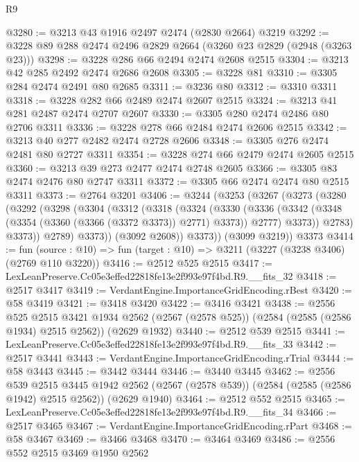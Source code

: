 \begin{lexlean}{R9}
\begin{coremodule}
@3280 := @3213 @43 @1916 @2497 @2474 (@2830 @2664) @3219
@3292 := @3228 @89 @288 @2474 @2496 @2829 @2664 (@3260 @23 @2829 (@2948 (@3263 @23)))
@3298 := @3228 @286 @66 @2494 @2474 @2608 @2515
@3304 := @3213 @42 @285 @2492 @2474 @2686 @2608
@3305 := @3228 @81
@3310 := @3305 @284 @2474 @2491 @80 @2685
@3311 := @3236 @80
@3312 := @3310 @3311
@3318 := @3228 @282 @66 @2489 @2474 @2607 @2515
@3324 := @3213 @41 @281 @2487 @2474 @2707 @2607
@3330 := @3305 @280 @2474 @2486 @80 @2706 @3311
@3336 := @3228 @278 @66 @2484 @2474 @2606 @2515
@3342 := @3213 @40 @277 @2482 @2474 @2728 @2606
@3348 := @3305 @276 @2474 @2481 @80 @2727 @3311
@3354 := @3228 @274 @66 @2479 @2474 @2605 @2515
@3360 := @3213 @39 @273 @2477 @2474 @2748 @2605
@3366 := @3305 @83 @2474 @2476 @80 @2747 @3311
@3372 := @3305 @66 @2474 @2474 @80 @2515 @3311
@3373 := @2764 @3201
@3406 := @3244
    (@3253
      (@3267
        (@3273
          (@3280
            (@3292
              (@3298
                (@3304
                  (@3312
                    (@3318
                      (@3324
                        (@3330
                          (@3336
                            (@3342 (@3348 (@3354 (@3360 (@3366 (@3372 @3373)) @2771) @3373)) @2777)
                            @3373))
                        @2783)
                      @3373))
                  @2789)
                @3373))
            (@3092 @2608))
          @3373))
      (@3099 @3219))
    @3373
@3414 := fun (source : @10) => fun (target : @10) => @3211 (@3227 (@3238 @3406) (@2769 @110 @3220))
@3416 := @2512 @525 @2515
@3417 := LexLeanPreserve.Cc05e3effed22818fe13e2f993e97f4bd.R9.__fits_32
@3418 := @2517 @3417
@3419 := VerdantEngine.ImportanceGridEncoding.rBest
@3420 := @58 @3419
@3421 := @3418 @3420
@3422 := @3416 @3421
@3438 := @2556
    @525
    @2515
    @3421
    @1934
    @2562
    (@2567 (@2578 @525))
    (@2584 (@2585 (@2586 @1934) @2515 @2562))
    (@2629 @1932)
@3440 := @2512 @539 @2515
@3441 := LexLeanPreserve.Cc05e3effed22818fe13e2f993e97f4bd.R9.__fits_33
@3442 := @2517 @3441
@3443 := VerdantEngine.ImportanceGridEncoding.rTrial
@3444 := @58 @3443
@3445 := @3442 @3444
@3446 := @3440 @3445
@3462 := @2556
    @539
    @2515
    @3445
    @1942
    @2562
    (@2567 (@2578 @539))
    (@2584 (@2585 (@2586 @1942) @2515 @2562))
    (@2629 @1940)
@3464 := @2512 @552 @2515
@3465 := LexLeanPreserve.Cc05e3effed22818fe13e2f993e97f4bd.R9.__fits_34
@3466 := @2517 @3465
@3467 := VerdantEngine.ImportanceGridEncoding.rPart
@3468 := @58 @3467
@3469 := @3466 @3468
@3470 := @3464 @3469
@3486 := @2556
    @552
    @2515
    @3469
    @1950
    @2562

\end{coremodule}
\end{lexlean}
